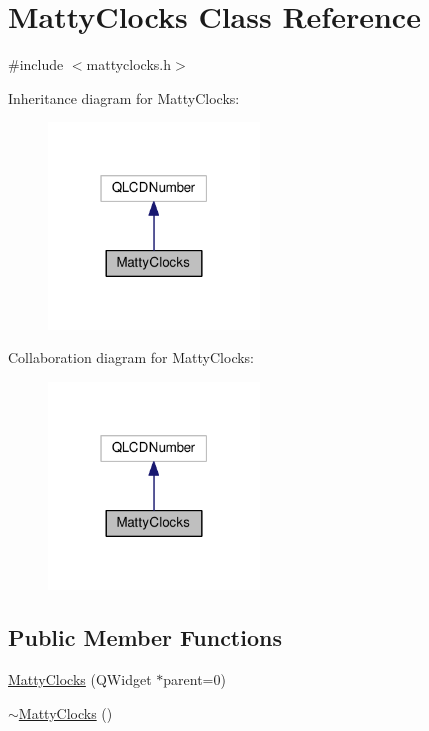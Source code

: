\hypertarget{class_matty_clocks}{}\section{Matty\+Clocks Class Reference}
\label{class_matty_clocks}


{\ttfamily \#include $<$mattyclocks.\+h$>$}



Inheritance diagram for Matty\+Clocks\+:
\nopagebreak
\begin{figure}[H]
\begin{center}
\leavevmode
\includegraphics[width=159pt]{class_matty_clocks__inherit__graph}
\end{center}
\end{figure}


Collaboration diagram for Matty\+Clocks\+:
\nopagebreak
\begin{figure}[H]
\begin{center}
\leavevmode
\includegraphics[width=159pt]{class_matty_clocks__coll__graph}
\end{center}
\end{figure}
\subsection*{Public Member Functions}
\begin{DoxyCompactItemize}
\item 
\hyperlink{class_matty_clocks_aa102bc39b1a1cc5aa1722cecf4779bf0}{Matty\+Clocks} (Q\+Widget $\ast$parent=0)
\item 
\hyperlink{class_matty_clocks_a62e37b4d89d3ca8f2f42299da93df5a4}{$\sim$\+Matty\+Clocks} ()
\end{DoxyCompactItemize}
